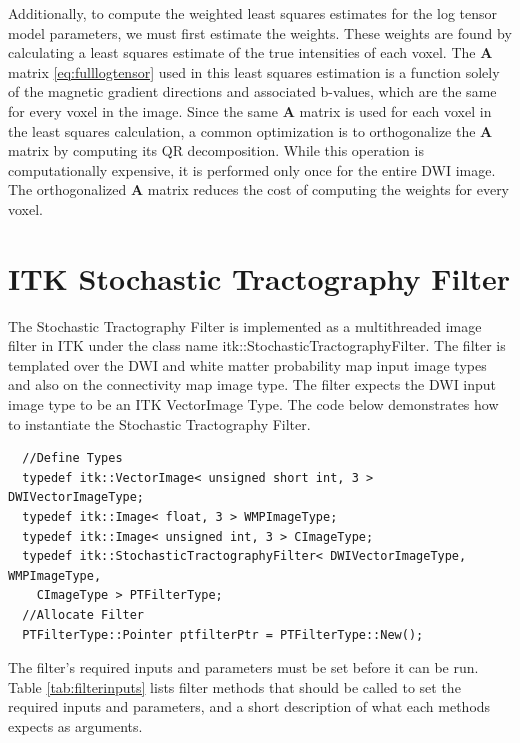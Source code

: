 Additionally, to compute the weighted least squares estimates for the log tensor model parameters, we must first estimate the weights.  These weights are found by calculating a least squares estimate of the true intensities of each voxel.  The $\mathbf{A}$ matrix \ref{eq:fulllogtensor} used in this least squares estimation is a function solely of the magnetic gradient directions and associated b-values, which are the same for every voxel in the image.  Since the same $\mathbf{A}$ matrix is used for each voxel in the least squares calculation, a common optimization is to orthogonalize the $\mathbf{A}$ matrix by computing its QR decomposition.  While this operation is computationally expensive, it is performed only once for the entire DWI image.  The orthogonalized $\mathbf{A}$ matrix reduces the cost of computing the weights for every voxel.

\section{ITK Stochastic Tractography Filter}
The Stochastic Tractography Filter is implemented as a multithreaded image filter in ITK under the class name itk::StochasticTractographyFilter.  The filter is templated over the DWI and white matter probability map input image types and also on the connectivity map image type.  The filter expects the DWI input image type to be an ITK VectorImage Type.  The code below demonstrates how to instantiate the Stochastic Tractography Filter.
\begin{verbatim}
  //Define Types
  typedef itk::VectorImage< unsigned short int, 3 > DWIVectorImageType;
  typedef itk::Image< float, 3 > WMPImageType;
  typedef itk::Image< unsigned int, 3 > CImageType;
  typedef itk::StochasticTractographyFilter< DWIVectorImageType, WMPImageType,
    CImageType > PTFilterType;
  //Allocate Filter
  PTFilterType::Pointer ptfilterPtr = PTFilterType::New();
\end{verbatim}

The filter's required inputs and parameters must be set before it can be run.  Table \ref{tab:filterinputs} lists filter methods that should be called to set the required inputs and parameters,  and a short description of what each methods expects as arguments.

